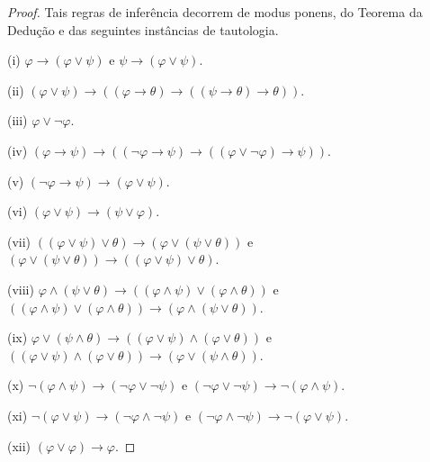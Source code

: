 \begin{proof}
    Tais regras de inferência decorrem de modus ponens, do Teorema da Dedução e das seguintes instâncias de tautologia.

    (i) $\varphi\rightarrow(\varphi\lor\psi)$ e $\psi\rightarrow(\varphi\lor\psi)$.

    (ii) $(\varphi\lor\psi)\rightarrow((\varphi\rightarrow\theta)\rightarrow((\psi\rightarrow\theta)\rightarrow\theta))$.

    (iii) $\varphi\lor\neg\varphi$.

    (iv) $(\varphi\rightarrow\psi)\rightarrow((\neg\varphi\rightarrow\psi)\rightarrow((\varphi\lor\neg\varphi)\rightarrow\psi))$.

    (v) $(\neg\varphi\rightarrow\psi)\rightarrow(\varphi\lor\psi)$.

    (vi) $(\varphi\lor\psi)\rightarrow(\psi\lor\varphi)$.

    (vii) $((\varphi\lor\psi)\lor\theta)\rightarrow(\varphi\lor(\psi\lor\theta))$ e $(\varphi\lor(\psi\lor\theta))\rightarrow((\varphi\lor\psi)\lor\theta)$.

    (viii) $\varphi\land(\psi\lor\theta)\rightarrow((\varphi\land\psi)\lor(\varphi\land\theta))$ e $((\varphi\land\psi)\lor(\varphi\land\theta))\rightarrow(\varphi\land(\psi\lor\theta))$.

    (ix) $\varphi\lor(\psi\land\theta)\rightarrow((\varphi\lor\psi)\land(\varphi\lor\theta))$ e $((\varphi\lor\psi)\land(\varphi\lor\theta))\rightarrow(\varphi\lor(\psi\land\theta))$.

    (x) $\neg(\varphi\land\psi)\rightarrow(\neg\varphi\lor\neg\psi)$ e $(\neg\varphi\lor\neg\psi)\rightarrow\neg(\varphi\land\psi)$.

    (xi) $\neg(\varphi\lor\psi)\rightarrow(\neg\varphi\land\neg\psi)$ e $(\neg\varphi\land\neg\psi)\rightarrow\neg(\varphi\lor\psi)$.

    (xii) $(\varphi\lor\varphi)\rightarrow\varphi$.
\end{proof}

